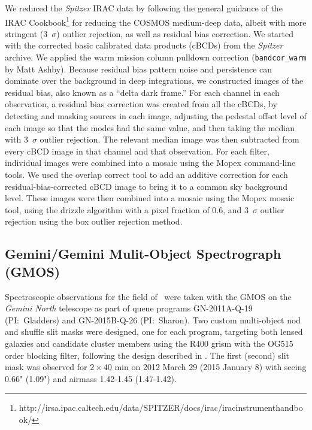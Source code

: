 We reduced the \textit{Spitzer} IRAC data by following the general guidance of the IRAC Cookbook\footnote{http://irsa.ipac.caltech.edu/data/SPITZER/docs/irac/iracinstrumenthandbook/} for reducing the COSMOS medium-deep data, albeit with more stringent (3~$\sigma$) outlier rejection, as well as residual bias correction. We started with the corrected basic calibrated data products (cBCDs) from the \textit{Spitzer} archive. We applied the warm mission column pulldown correction (\texttt{bandcor\_warm} by Matt Ashby). Because residual bias pattern noise and persistence can dominate over the background in deep integrations, we constructed images of the residual bias, also known as a ``delta dark frame.''  For each channel in each observation, a residual bias correction was created from all the cBCDs, by detecting and masking sources in each image, adjusting the pedestal offset level of each image so that the modes had the same value, and then taking the median with 3~$\sigma$ outlier rejection.  The relevant median image was then subtracted from every cBCD image in that channel and that observation. For each filter, individual images were combined into a mosaic using the Mopex command-line tools. We used the overlap correct tool to add an additive correction for each residual-bias-corrected cBCD image to bring it to a common sky background level.  These images were then combined into a mosaic using the Mopex mosaic tool, using the drizzle algorithm with a pixel fraction of 0.6, and 3~$\sigma$ outlier rejection using the box outlier rejection method.

\subsection{Gemini/Gemini Mulit-Object Spectrograph (GMOS)}
\label{chap4:sec:specz}
Spectroscopic observations for the field of \cluster\ were taken with the GMOS \citep{Hook:2004yq} on the {\it Gemini North} telescope as part of queue programs GN-2011A-Q-19 (PI:~Gladders) and GN-2015B-Q-26 (PI:~Sharon). Two custom multi-object nod and shuffle slit masks were designed, one for each program, targeting both lensed galaxies and candidate cluster members using the R400 grism with the OG515 order blocking filter, following the design described in \citet{Bayliss:2011ul}. The first (second) slit mask was observed for $2\times40$ min on 2012 March 29 (2015 January 8) with seeing 0.66" (1.09") and airmass 1.42-1.45 (1.47-1.42).

